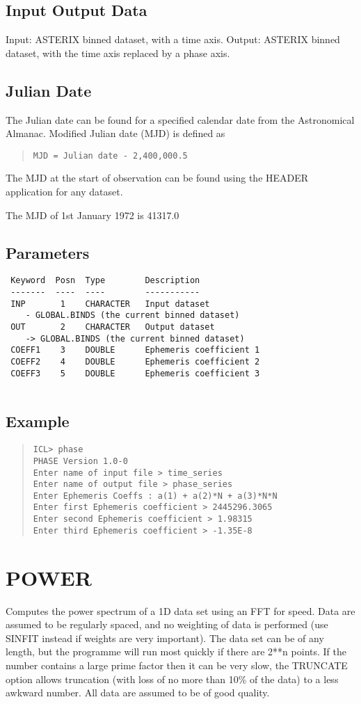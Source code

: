 \documentclass{book}
\renewcommand{\_}{{\tt\char'137}}     %
\begin{document}
\subsection{Input Output Data}
Input: ASTERIX binned dataset, with a time axis.
Output: ASTERIX binned dataset, with the time axis
replaced by a phase axis.
\subsection{Julian Date}
The Julian date can be found for a specified calendar date from the
Astronomical Almanac. Modified Julian date (MJD) is defined as
\begin{quote}\begin{verbatim}
MJD = Julian date - 2,400,000.5
\end{verbatim}\end{quote}
The MJD at the start of observation can be found using the HEADER
application for any dataset.
 
The MJD of 1st January 1972 is 41317.0
 
\subsection{Parameters}
\begin{verbatim}
 Keyword  Posn  Type        Description
 -------  ----  ----        -----------
 INP       1    CHARACTER   Input dataset
    - GLOBAL.BINDS (the current binned dataset)
 OUT       2    CHARACTER   Output dataset
    -> GLOBAL.BINDS (the current binned dataset)
 COEFF1    3    DOUBLE      Ephemeris coefficient 1
 COEFF2    4    DOUBLE      Ephemeris coefficient 2
 COEFF3    5    DOUBLE      Ephemeris coefficient 3
 
\end{verbatim}\subsection{Example}
\begin{quote}\begin{verbatim}
ICL> phase
PHASE Version 1.0-0
Enter name of input file > time_series
Enter name of output file > phase_series
Enter Ephemeris Coeffs : a(1) + a(2)*N + a(3)*N*N
Enter first Ephemeris coefficient > 2445296.3065
Enter second Ephemeris coefficient > 1.98315
Enter third Ephemeris coefficient > -1.35E-8
\end{verbatim}\end{quote}
\section{POWER}
Computes the power spectrum of a 1D data set using an FFT for
speed. Data are assumed to be regularly spaced, and no weighting
of data is performed (use SINFIT instead if weights are very
important). The data set can be of any length, but the programme
will run most quickly if there are 2**n points. If the number
contains a large prime factor then it can be very slow, the
TRUNCATE option allows truncation (with loss of no more than 10\%
of the data) to a less awkward number. All data are assumed to be
of good quality.
 
\end{document}
